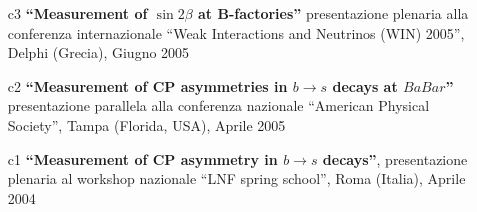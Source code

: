 \documentclass[11pt,twoside,a4paper]{article}
\begin{document}
\begin{enumerate}
\item [c3] \textbf{``Measurement of $\sin 2\beta$ at B-factories''}
  presentazione plenaria alla conferenza internazionale ``Weak
  Interactions and Neutrinos (WIN) 2005'', Delphi (Grecia), Giugno
  2005
  \vspace{2mm}

\item [c2] \textbf{``Measurement of CP asymmetries in $b \rightarrow s$
  decays at $BaBar$''} presentazione parallela alla conferenza
  nazionale ``American Physical Society'', Tampa (Florida, USA),
  Aprile 2005
  \vspace{2mm}

\item [c1] \textbf{``Measurement of CP asymmetry in $b \rightarrow s$
  decays''}, presentazione plenaria al workshop nazionale ``LNF spring
  school'', Roma (Italia), Aprile 2004
  \vspace{2mm}

\end{enumerate}

  
\end{document}
